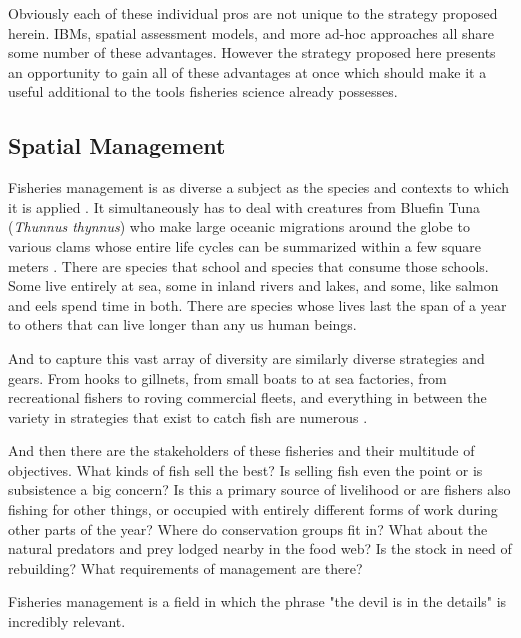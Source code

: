 \documentclass[11pt]{article}
\begin{document}
\begin{enumerate}
\end{enumerate}

Obviously each of these individual pros are not unique to the strategy proposed herein. IBMs, spatial assessment models, and more ad-hoc approaches all share some number of these advantages. However the strategy proposed here presents an opportunity to gain all of these advantages at once which should make it a useful additional to the tools fisheries science already possesses. 
\newpage



\subsection{Spatial Management}\label{spatial_management}

Fisheries management is as diverse a subject as the species and contexts to which it is applied \citep{waltersmartell} \citep{king}. It simultaneously has to deal with creatures from Bluefin Tuna (\textit{Thunnus thynnus}) who make large oceanic migrations around the globe to various clams whose entire life cycles can be summarized within a few square meters \citep{prince2010}. There are species that school and species that consume those schools. Some live entirely at sea, some in inland rivers and lakes, and some, like salmon and eels spend time in both. There are species whose lives last the span of a year to others that can live longer than any us human beings. 

And to capture this vast array of diversity are similarly diverse strategies and gears. From hooks to gillnets, from small boats to at sea factories, from recreational fishers to roving commercial fleets, and everything in between the variety in strategies that exist to catch fish are numerous \citep{waltersmartell} \citep{king}. 

And then there are the stakeholders of these fisheries and their multitude of objectives. What kinds of fish sell the best? Is selling fish even the point or is subsistence a big concern? Is this a primary source of livelihood or are fishers also fishing for other things, or occupied with entirely different forms of work during other parts of the year? Where do conservation groups fit in? What about the natural predators and prey lodged nearby in the food web? Is the stock in need of rebuilding? What requirements of management are there? \citep{waltersmartell} \citep{king}

Fisheries management is a field in which the phrase "the devil is in the details" is incredibly relevant. \newline
\end{document}
